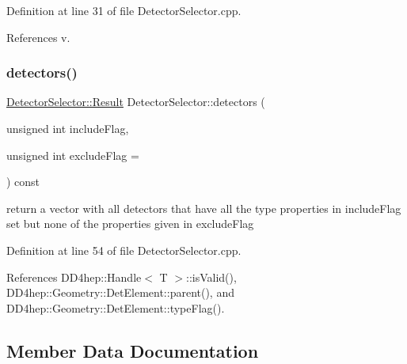 Definition at line 31 of file Detector\+Selector.\+cpp.



References v.

\hypertarget{class_d_d4hep_1_1_geometry_1_1_detector_selector_a41570aef7735a6914c4e7e3f067f6fab}{}\label{class_d_d4hep_1_1_geometry_1_1_detector_selector_a41570aef7735a6914c4e7e3f067f6fab} 
\subsubsection{\texorpdfstring{detectors()}{detectors()}\hspace{0.1cm}{\footnotesize\ttfamily [3/3]}}
{\footnotesize\ttfamily \hyperlink{class_d_d4hep_1_1_geometry_1_1_detector_selector_a6ce0dfe8c83f5d36138244218f260ed1}{Detector\+Selector\+::\+Result} Detector\+Selector\+::detectors (\begin{DoxyParamCaption}\item[{unsigned int}]{include\+Flag,  }\item[{unsigned int}]{exclude\+Flag = {} }\end{DoxyParamCaption}) const}

return a vector with all detectors that have all the type properties in include\+Flag set but none of the properties given in exclude\+Flag 

Definition at line 54 of file Detector\+Selector.\+cpp.



References D\+D4hep\+::\+Handle$<$ T $>$\+::is\+Valid(), D\+D4hep\+::\+Geometry\+::\+Det\+Element\+::parent(), and D\+D4hep\+::\+Geometry\+::\+Det\+Element\+::type\+Flag().



\subsection{Member Data Documentation}
\hypertarget{class_d_d4hep_1_1_geometry_1_1_detector_selector_a6091743fea97ad21aa2bca9e5da2d3d0}{}\label{class_d_d4hep_1_1_geometry_1_1_detector_selector_a6091743fea97ad21aa2bca9e5da2d3d0} 
